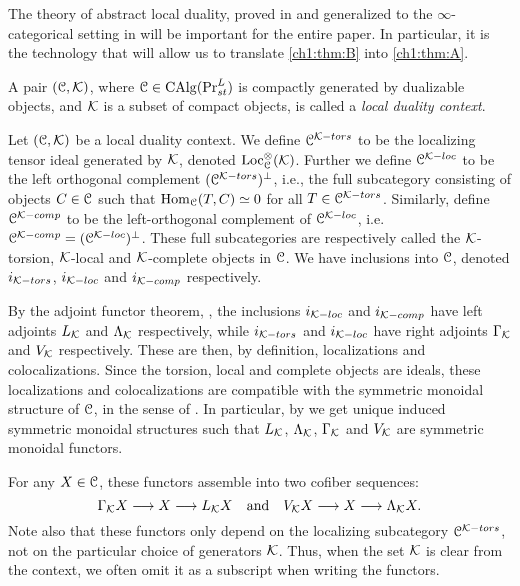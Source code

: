The theory of abstract local duality, proved in \cite{hovey-palmiery-strickland_97} and generalized to the $\infty$-categorical setting in \cite{barthel-heard-valenzuela_2018} will be important for the entire paper. In particular, it is the technology that will allow us to translate \cref{ch1:thm:B} into \cref{ch1:thm:A}. 

\begin{definition}
    \label{ch1:def:local-duality-context}
    A pair $(\EuScript{C}, \mathcal{K})$, where $\EuScript{C}\in \operatorname{CAlg}(\mathrm{Pr}_{st}^L)$ is compactly generated by dualizable objects, and $\mathcal{K}$ is a subset of compact objects, is called a \emph{local duality context}.
\end{definition}

\begin{construction}
    Let $(\EuScript{C}, \mathcal{K})$ be a local duality context. We define $\EuScript{C}^{\mathcal{K}-tors}$ to be the localizing tensor ideal generated by $\mathcal{K}$, denoted $\operatorname{Loc}^\otimes_{\EuScript{C}}(\mathcal{K})$. Further we define $\EuScript{C}^{\mathcal{K}-loc}$ to be the left orthogonal complement $(\EuScript{C}^{\mathcal{K}-tors})^\perp$, i.e., the full subcategory consisting of objects $C\in \EuScript{C}$ such that $\operatorname{Hom}_{\EuScript{C}}(T,C)\simeq 0$ for all $T\in \EuScript{C}^{\mathcal{K}-tors}$. Similarly, define $\EuScript{C}^{\mathcal{K}-comp}$ to be the left-orthogonal complement of $\EuScript{C}^{\mathcal{K}-loc}$, i.e. $\EuScript{C}^{\mathcal{K}-comp}= (\EuScript{C}^{\mathcal{K}-loc})^\perp$. These full subcategories are respectively called the $\mathcal{K}$-torsion, $\mathcal{K}$-local and $\mathcal{K}$-complete objects in $\EuScript{C}$. We have inclusions into $\EuScript{C}$, denoted $i_{\mathcal{K}-tors}$, $i_{\mathcal{K}-loc}$ and $i_{\mathcal{K}-comp}$ respectively. 
    
    By the adjoint functor theorem, \cite[5.5.2.9]{lurie_09}, the inclusions $i_{\mathcal{K}-loc}$ and $i_{\mathcal{K}-comp}$ have left adjoints $L_{\mathcal{K}}$ and $\Lambda_{\mathcal{K}}$ respectively, while $i_{\mathcal{K}-tors}$ and $i_{\mathcal{K}-loc}$ have right adjoints $\Gamma_{\mathcal{K}}$ and $V_{\mathcal{K}}$ respectively. These are then, by definition, localizations and colocalizations. Since the torsion, local and complete objects are ideals, these localizations and colocalizations are compatible with the symmetric monoidal structure of $\EuScript{C}$, in the sense of \cite[2.2.1.7]{Lurie_HA}. In particular, by \cite[2.2.1.9]{Lurie_HA} we get unique induced symmetric monoidal structures such that $L_{\mathcal{K}}$, $\Lambda_{\mathcal{K}}$, $\Gamma_{\mathcal{K}}$ and $V_{\mathcal{K}}$ are symmetric monoidal functors. 

    For any $X\in \EuScript{C}$, these functors assemble into two cofiber sequences:
    $$\Gamma_{\mathcal{K}} X \longrightarrow X \longrightarrow L_{\mathcal{K}} X \quad \text{and}\quad V_{\mathcal{K}} X \longrightarrow X \longrightarrow \Lambda_{\mathcal{K}} X.$$
    Note also that these functors only depend on the localizing subcategory $\EuScript{C}^{\mathcal{K}-tors}$, not on the particular choice of generators $\mathcal{K}$. Thus, when the set $\mathcal{K}$ is clear from the context, we often omit it as a subscript when writing the functors. 
\end{construction}

